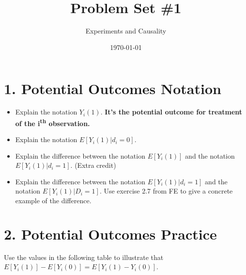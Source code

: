 \documentclass[]{article}
\title{Problem Set \#1}
\author{Experiments and Causality}
\date{\today}
\begin{document}
\maketitle

\hypertarget{potential-outcomes-notation}{%
\section{1. Potential Outcomes
Notation}\label{potential-outcomes-notation}}

\begin{itemize}
\item
  Explain the notation \(Y_{i}(1)\). \textbf{It's the potential outcome
  for treatment of the i\textsuperscript{th} observation.}
\item
  Explain the notation \(E[Y_{i}(1)|d_{i}=0]\).
\item
  Explain the difference between the notation \(E[Y_{i}(1)]\) and the
  notation \(E[Y_{i}(1)|d_{i}=1]\). (Extra credit)
\item
  Explain the difference between the notation \(E[Y_{i}(1)|d_{i}=1]\)
  and the notation \(E[Y_{i}(1)|D_{i}=1]\). Use exercise 2.7 from FE to
  give a concrete example of the difference.
\end{itemize}

\hypertarget{potential-outcomes-practice}{%
\section{2. Potential Outcomes
Practice}\label{potential-outcomes-practice}}

Use the values in the following table to illustrate that
\(E[Y_{i}(1)] - E[Y_{i}(0)] = E[Y_{i}(1) - Y_{i}(0)]\).
\end{document}
